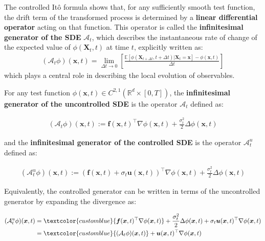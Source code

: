 \documentclass{article}
\newcommand{\boldtext}[1]{\textbf{\textcolor{MyGreen}{#1}}}
\newcommand{\bluetext}[1]{\textcolor{customblue}{#1}}
\begin{document}
The controlled Itô formula shows that, for any sufficiently smooth test function, the drift term of the transformed process is determined by a \textbf{linear differential operator} acting on that function. This operator is called the \boldtext{infinitesimal generator of the SDE} $\mathcal{A}_t$, which describes the instantaneous rate of change of the expected value of $\phi(\boldsymbol{X}_t,t)$ at time $t$, explicitly written as:
\begin{align}
    (\mathcal{A}_t\phi)(\boldsymbol{x},t)=\lim_{\Delta t\to 0}\left[\frac{\mathbb{E}[\phi(\boldsymbol{X}_{t+\Delta t},t+\Delta t)|\boldsymbol{X}_t=\boldsymbol{x}]-\phi(\boldsymbol{x},t)}{\Delta t}\right]\tag{Infinitesmal Generator}
\end{align}
which plays a central role in describing the local evolution of observables.

\begin{definition}\label{def:infinitesmal generator}
    For any test function $\phi(\boldsymbol{x},t)\in C^{2,1}(\mathbb{R}^d\times [0,T])$, the \textbf{infinitesimal generator of the uncontrolled SDE} is the operator $\mathcal{A}_t$ defined as:
    \begin{small}
    \begin{align}
        (\mathcal{A}_t\phi)(\boldsymbol{x},t):=\boldsymbol{f}(\boldsymbol{x},t)^\top \nabla \phi(\boldsymbol{x},t)+\frac{\sigma^2_t}{2}\Delta \phi(\boldsymbol{x},t)\tag{Uncontrolled Generator}\label{eq:ito-uncontrolled-generator}
    \end{align}
    \end{small}
    and the \textbf{infinitesimal generator of the controlled SDE} is the operator $\mathcal{A}_t^u$ defined as:
    \begin{small}
    \begin{align}
        (\mathcal{A}^u_t\phi)(\boldsymbol{x},t):=(\boldsymbol{f}(\boldsymbol{x},t)+\sigma_t\boldsymbol{u}(\boldsymbol{x},t))^\top \nabla\phi(\boldsymbol{x},t)+\frac{\sigma^2_t}{2}\Delta \phi(\boldsymbol{x},t)\tag{Controlled Generator}\label{eq:ito-controlled-generator}
    \end{align}
    \end{small}
    Equivalently, the controlled generator can be written in terms of the uncontrolled generator by expanding the divergence as:
    \begin{small}
    \begin{align}
        (\mathcal{A}^u_t\phi)(\boldsymbol{x},t)&=\bluetext{\boldsymbol{f}(\boldsymbol{x},t)^\top \nabla \phi(\boldsymbol{x},t)}+\frac{\sigma^2_t}{2}\Delta \phi(\boldsymbol{x},t)+\sigma_t\boldsymbol{u}(\boldsymbol{x},t)^\top \nabla\phi(\boldsymbol{x},t)\nonumber\\
        &=\bluetext{(\mathcal{A}_t\phi)(\boldsymbol{x},t)}+\boldsymbol{u}(\boldsymbol{x},t)^\top\nabla\phi(\boldsymbol{x},t)\label{eq:generator-control-to-uncontrolled}
    \end{align}
    \end{small}
\end{definition}
\end{document}
